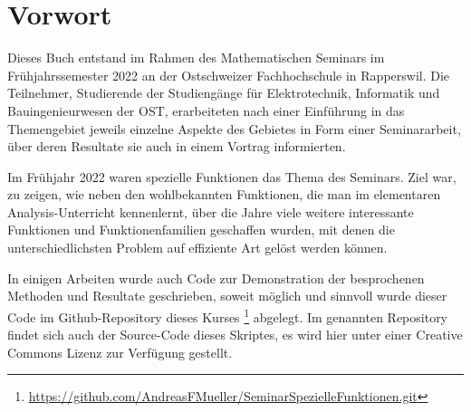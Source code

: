 %
%
%
\chapter*{Vorwort}
\rhead{}
Dieses Buch entstand im Rahmen des Mathematischen Seminars
im Frühjahrssemester 2022 an der Ostschweizer Fachhochschule in Rapperswil.
Die Teilnehmer, Studierende der Studiengänge für Elektrotechnik,
Informatik und Bauingenieurwesen 
der OST, erarbeiteten nach einer Einführung in das Themengebiet jeweils
einzelne Aspekte des Gebietes in Form einer Seminararbeit, über
deren Resultate sie auch in einem Vortrag informierten. 

Im Frühjahr 2022 waren spezielle Funktionen das Thema des Seminars.
Ziel war, zu zeigen, wie neben den wohlbekannten Funktionen, die
man im elementaren Analysis-Unterricht kennenlernt, über die Jahre
viele weitere interessante Funktionen und Funktionenfamilien 
geschaffen wurden, mit denen die unterschiedlichsten Problem
auf effiziente Art gelöst werden können.

In einigen Arbeiten wurde auch Code zur Demonstration der 
besprochenen Methoden und Resultate geschrieben, soweit
möglich und sinnvoll wurde dieser Code im Github-Repository
%
dieses Kurses%
\footnote{\url{https://github.com/AndreasFMueller/SeminarSpezielleFunktionen.git}}
\cite{buch:repo}
abgelegt.
Im genannten Repository findet sich auch der Source-Code dieses
Skriptes, es wird hier unter einer Creative Commons Lizenz
zur Verfügung gestellt.


